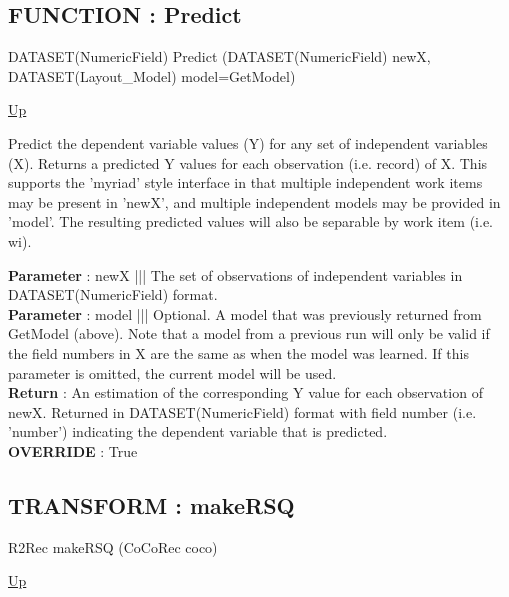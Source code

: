 \subsection*{FUNCTION : Predict}
\hypertarget{ecldoc:linearregression.ols.predict}{}
\begin{minipage}[t]{\textwidth}
\begin{flushleft}
DATASET(NumericField) Predict (DATASET(NumericField) newX, DATASET(Layout\_Model) model=GetModel)
\end{flushleft}
\end{minipage}
\hyperlink{ecldoc:linearregression.ols}{Up}

\par
Predict the dependent variable values (Y) for any set of independent variables (X). Returns a predicted Y values for each observation (i.e. record) of X. This supports the 'myriad' style interface in that multiple independent work items may be present in 'newX', and multiple independent models may be provided in 'model'. The resulting predicted values will also be separable by work item (i.e. wi).
\par
\textbf{Parameter} : newX ||| The set of observations of independent variables in DATASET(NumericField) format. \\
\textbf{Parameter} : model ||| Optional. A model that was previously returned from GetModel (above). Note that a model from a previous run will only be valid if the field numbers in X are the same as when the model was learned. If this parameter is omitted, the current model will be used. \\
\textbf{Return} : An estimation of the corresponding Y value for each observation of newX. Returned in DATASET(NumericField) format with field number (i.e. 'number') indicating the dependent variable that is predicted. \\
\textbf{OVERRIDE} : True \\
\subsection*{TRANSFORM : makeRSQ}
\hypertarget{ecldoc:linearregression.ols.makersq}{}
\begin{minipage}[t]{\textwidth}
\begin{flushleft}
R2Rec makeRSQ (CoCoRec coco)
\end{flushleft}
\end{minipage}
\hyperlink{ecldoc:linearregression.ols}{Up}

\par
\par
